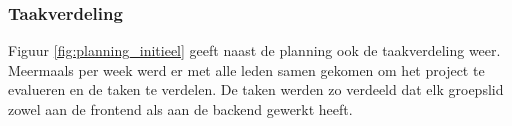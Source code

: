\subsubsection{Taakverdeling}

Figuur \ref{fig:planning_initieel} geeft naast de planning ook de taakverdeling weer. Meermaals per week werd er met alle leden samen gekomen om het project te evalueren en de taken te verdelen. De taken werden zo verdeeld dat elk groepslid zowel aan de frontend als aan de backend gewerkt heeft.
